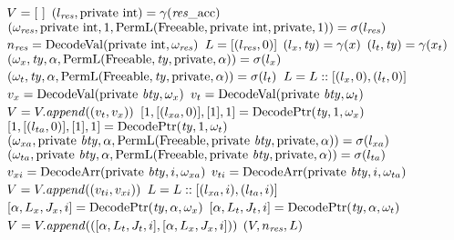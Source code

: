 \begin{algorithm*}\footnotesize
\caption{$(\valL, \n_{\res}, \locL) \gets \ResolveR(\x_{\vl}, \Acc, \gamma, \sigma)$}
\label{algo: resolve R}
\begin{algorithmic}
	\STATE $V = [\ ]$
	\STATE $(l_{\mathit{res}}, \mathrm{private}\ \mathrm{int}) = \gamma(\mathit{res}\_\mathrm{acc})$
	\STATE $(\omega_{\mathit{res}}, \mathrm{private}\ \mathrm{int}, 1, \mathrm{PermL}(\mathrm{Freeable}, \mathrm{private}\ \mathrm{int}, \mathrm{private}, 1)) = \sigma(l_{\mathit{res}})$
	\STATE $n_{\mathit{res}} = \mathrm{DecodeVal}(\mathrm{private}\ \mathrm{int}, \omega_{\mathit{res}})$
	\STATE $L = [(l_{\mathit{res}}, 0)]$
	\FORALL{ $\x \in \x_{\vl}$ }	
		\STATE $(l_x, \mathit{ty}) = \gamma(x)$
		\STATE $(l_t, \mathit{ty}) = \gamma(x_t)$	
		\STATE $(\omega_{x}, \mathit{ty}, \alpha, \mathrm{PermL}(\mathrm{Freeable}, \mathit{ty}, \mathrm{private}, \alpha)) = \sigma(l_x)$
		\STATE $(\omega_{t}, \mathit{ty}, \alpha, \mathrm{PermL}(\mathrm{Freeable}, \mathit{ty}, \mathrm{private}, \alpha)) = \sigma(l_t)$
		\STATE $L = L :: [(l_x, 0), (l_t, 0)]$
		\IF{ $(\Type = \Priv\ \btype)$ }	
			\STATE $v_{x} = \mathrm{DecodeVal}(\mathrm{private}\ \mathit{bty}, \omega_{x})$
			\STATE $\val_{t} = \Decode(\Priv\ \btype, \byte_{t})$
			\STATE $V = V.\mathit{append}((v_{t}, v_{x}))$
		\ELSIF{ $(\Type = \Priv\ \Const\ \btype*)$ }	
			\STATE $[1, [(l_{xa}, 0)], [1], 1] = \mathrm{DecodePtr}(\mathit{ty}, 1, \omega_{x})$
			\STATE $[1, [(l_{ta}, 0)], [1], 1] = \mathrm{DecodePtr}(\mathit{ty}, 1, \omega_{t})$
			\STATE $(\omega_{xa}, \mathrm{private}\ \mathit{bty}, \alpha, \mathrm{PermL}(\mathrm{Freeable}, \mathrm{private}\ \mathit{bty}, \mathrm{private}, \alpha)) = \sigma(l_{xa})$
			\STATE $(\omega_{ta}, \mathrm{private}\ \mathit{bty}, \alpha, \mathrm{PermL}(\mathrm{Freeable}, \mathrm{private}\ \mathit{bty}, \mathrm{private}, \alpha)) = \sigma(l_{ta})$
				\STATE $v_{xi} = \mathrm{DecodeArr}(\mathrm{private}\ \mathit{bty}, i, \omega_{xa})$
				\STATE $v_{ti} = \mathrm{DecodeArr}(\mathrm{private}\ \mathit{bty}, i, \omega_{ta})$
				\STATE $V = V.\mathit{append}((v_{ti}, v_{xi}))$
				\STATE $L = L :: [(l_{xa}, i), (l_{ta}, i)]$
			\ENDFOR
		\ELSIF{$(\Type = \Priv\ \btype*)$}	
			\STATE $[\alpha, L_x, J_x, i] = \mathrm{DecodePtr}(\mathit{ty}, \alpha, \omega_{x})$
			\STATE $[\alpha, L_t, J_t, i] = \mathrm{DecodePtr}(\mathit{ty}, \alpha, \omega_{t})$
			\STATE $V = V.\mathit{append}(([\alpha, L_t, J_t, i], [\alpha, L_x, J_x, i]))$
		\ENDIF	
	\ENDFOR
	\RETURN $(V, n_{\mathit{res}}, L)$	
\end{algorithmic}
\end{algorithm*}



